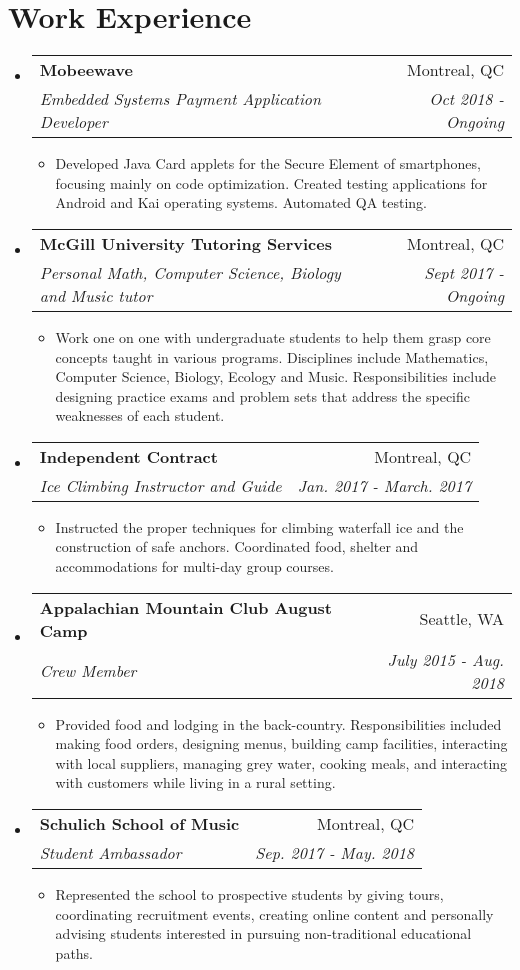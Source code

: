 \documentclass[letterpaper,11pt]{article}
\makeatletter
\newcommand{\resitem}[1]{\item #1 \vspace{-2pt}}
\newcommand{\ressubheading}[4]{
\begin{tabular*}{6.1in}{l@{\extracolsep{\fill}}r}
		\textbf{#1} & #2 \\
		\textit{#3} & \textit{#4} \\
\end{tabular*}\vspace{-1pt}}
\makeatother
\begin{document}
\section*{Work Experience}
\begin{itemize}
\item
	\ressubheading{Mobeewave}{Montreal, QC}{Embedded Systems Payment Application Developer}{Oct 2018 - Ongoing}
	\begin{itemize}
		\resitem{Developed Java Card applets for the Secure Element of smartphones, focusing mainly on code optimization. Created testing applications for Android and Kai operating systems. Automated QA testing.}
	\end{itemize}
	
\item
	\ressubheading{McGill University Tutoring Services}{Montreal, QC}{Personal Math, Computer Science, Biology and Music tutor}{Sept 2017 - Ongoing}
	\begin{itemize}
		\resitem{Work one on one with undergraduate students to help them grasp core concepts taught in various programs. Disciplines include Mathematics, Computer Science, Biology, Ecology and Music. Responsibilities include designing practice exams and problem sets that address the specific weaknesses of each student.}
	\end{itemize}
	
\item
	\ressubheading{Independent Contract}{Montreal, QC}{Ice Climbing Instructor and Guide}{Jan. 2017 - March. 2017}
	\begin{itemize}
		\resitem{Instructed the proper techniques for climbing waterfall ice and the construction of safe anchors. Coordinated food, shelter and accommodations for multi-day group courses.}
	\end{itemize}

\item 
	\ressubheading{Appalachian Mountain Club August Camp}{Seattle, WA}{Crew Member}{July 2015 - Aug. 2018}
	\begin{itemize}
		\resitem{Provided food and lodging in the back-country. Responsibilities included making food orders, designing menus, building camp facilities, interacting with local suppliers, managing grey water, cooking meals, and interacting with customers while living in a rural setting.}
	\end{itemize}

\item
	\ressubheading{Schulich School of Music}{Montreal, QC}{Student Ambassador}{Sep. 2017 - May. 2018}
	\begin{itemize}
		\resitem{Represented the school to prospective students by giving tours, coordinating recruitment events, creating online content and personally advising students interested in pursuing non-traditional educational paths.}
	\end{itemize}


\end{itemize}
\end{document}
